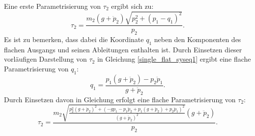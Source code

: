 Eine erste Parametrisierung von $\tau_2$ ergibt sich zu:
\begin{equation}
	\label{eq:pre_single_crane_tau2_w_q1}
	\tau_2 = \frac{m_{2} \left(g + \ddot{p}_{2}\right) \sqrt{p_{2}^{2} + \left(p_{1} - q_{1}\right)^{2}}}{p_{2}}.
\end{equation}
Es ist zu bemerken, dass dabei die Koordinate $q_1$ neben den Komponenten des flachen Ausgangs und seinen Ableitungen enthalten ist. Durch Einsetzen dieser vorläufigen Darstellung von $\tau_2$ in Gleichung \eqref{single_flat_syseq1} ergibt eine flache Parametrisierung von $q_1$:
\begin{equation}
	q_1 = \frac{p_{1} \left(g + \ddot{p}_{2}\right) - p_{2} \ddot{p}_{1}}{g + \ddot{p}_{2}}.
\end{equation}
Durch Einsetzen davon in Gleichung \label{eq:pre_single_crane_tau2_w_q1} erfolgt eine flache Parametrisierung von $\tau_2$:
\begin{equation}
	\tau_2 =
	\frac{m_{2} \sqrt{\frac{p_{2}^{2} \left(g + \ddot{p}_{2}\right)^{2} + \left(- g p_{1} - p_{1} \ddot{p}_{2} + p_{1} \left(g + \ddot{p}_{2}\right) + p_{2} \ddot{p}_{1}\right)^{2}}{\left(g + \ddot{p}_{2}\right)^{2}}} \left(g + \ddot{p}_{2}\right)}{p_{2}}.
\end{equation}

